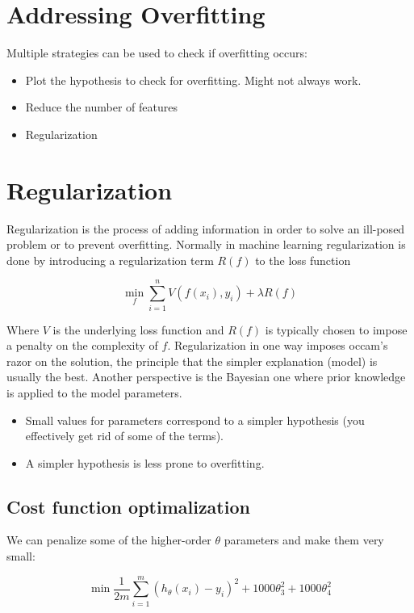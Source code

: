 \section{Addressing Overfitting}
Multiple strategies can be used to check if overfitting occurs:
\begin{itemize}
    \item Plot the hypothesis to check for overfitting. Might not always work.
    \item Reduce the number of features
    \item Regularization
\end{itemize}

\section{Regularization}

Regularization is the process of adding information in order to solve an 
ill-posed problem or to prevent overfitting. Normally in machine learning
regularization is done by introducing a regularization term $R(f)$ to the loss
function 

\begin{equation*}
    \min_f \sum_{i = 1}^n V(f(x_i), y_i) + \lambda R(f)
\end{equation*}

Where $V$ is the underlying loss function and $R(f)$ is typically chosen to 
impose a penalty on the complexity of $f$. Regularization in one way imposes
occam's razor on the solution, the principle that the simpler explanation 
(model) is usually the best. Another perspective is the Bayesian one where 
prior knowledge is applied to the model parameters.

\begin{itemize}
    \item Small values for parameters correspond to a simpler hypothesis (you effectively get rid of some of the terms).
    \item A simpler hypothesis is less prone to overfitting.
\end{itemize}

\subsection{Cost function optimalization}
We can penalize some of the higher-order $\theta$ parameters and make them very small:

\[
    \min\frac{1}{2m}\sum_{i=1}^{m}\left(h_{\theta}(x_i)-y_i\right)^2 + 1000\theta_3^2 + 1000\theta_4^2
\]

